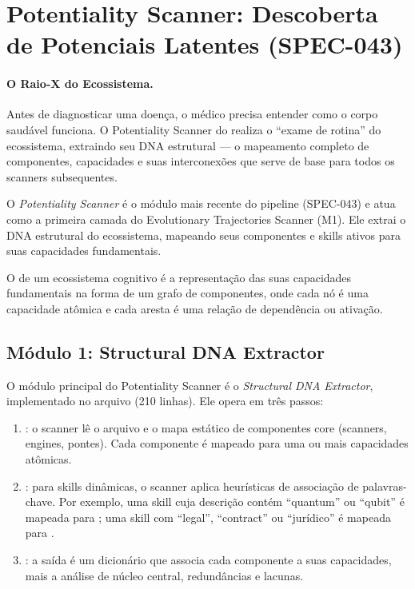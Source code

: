 \section{Potentiality Scanner: Descoberta de Potenciais Latentes (SPEC-043)}
\label{sec:potentiality-scanner}
\nivelphd

\paragraph{O Raio-X do Ecossistema.} Antes de diagnosticar uma doença, o médico precisa entender como o corpo saudável funciona. O Potentiality Scanner do \opencodeeco{} realiza o ``exame de rotina'' do ecossistema, extraindo seu DNA estrutural --- o mapeamento completo de componentes, capacidades e suas interconexões que serve de base para todos os scanners subsequentes.

O \emph{Potentiality Scanner} é o módulo mais recente do pipeline (SPEC-043)
e atua como a primeira camada do Evolutionary Trajectories Scanner
(M1). Ele extrai o DNA estrutural do ecossistema, mapeando seus componentes
e skills ativos para suas capacidades fundamentais.

\begin{definicao}
O  de um ecossistema cognitivo é a representação
das suas capacidades fundamentais na forma de um grafo de componentes,
onde cada nó é uma capacidade atômica e cada aresta é uma relação de
dependência ou ativação.
\end{definicao}

\subsection{Módulo 1: Structural DNA Extractor}

O módulo principal do Potentiality Scanner é o \emph{Structural DNA
Extractor}, implementado no arquivo  (210
linhas). Ele opera em três passos:

\begin{enumerate}
\item {}: o scanner lê o
arquivo  e o mapa estático de componentes
core (scanners, engines, pontes). Cada componente é mapeado para uma ou
mais capacidades atômicas.
\item {}: para skills
dinâmicas, o scanner aplica heurísticas de associação de palavras-chave.
Por exemplo, uma skill cuja descrição contém ``quantum'' ou ``qubit'' é
mapeada para ; uma skill com ``legal'',
``contract'' ou ``jurídico'' é mapeada para .
\item {}: a saída é um dicionário
que associa cada componente a suas capacidades, mais a análise de núcleo
central, redundâncias e lacunas.
\end{enumerate}

